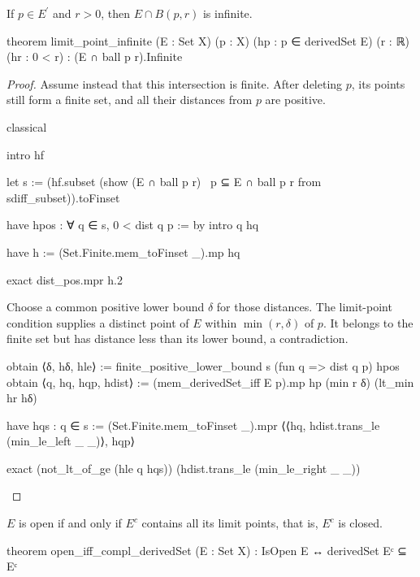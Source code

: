 \begin{proposition}
  \label{an1:thm:limit-point-neighborhood-contains-infinite-elements}
  If $p\in E^{\prime}$ and $r>0$, then $E\cap B(p,r)$ is infinite.

  \begin{lean}
    theorem limit_point_infinite (E : Set X) (p : X)
        (hp : p ∈ derivedSet E) (r : ℝ) (hr : 0 < r) :
        (E ∩ ball p r).Infinite
  \end{lean}
\end{proposition}

\begin{proof}
  Assume instead that this intersection is finite.
  After deleting $p$, its points still form a finite set, and all their distances from $p$ are
  positive.

  \begin{lean}
    classical

    intro hf

    let s := (hf.subset (show (E ∩ ball p r) \ {p} ⊆ E ∩ ball p r from sdiff_subset)).toFinset

    have hpos : ∀ q ∈ s, 0 < dist q p := by
      intro q hq

      have h := (Set.Finite.mem_toFinset _).mp hq

      exact dist_pos.mpr h.2
  \end{lean}

  Choose a common positive lower bound $\delta$ for those distances.
  The limit-point condition supplies a distinct point of $E$ within $\min(r,\delta)$ of $p$.
  It belongs to the finite set but has distance less than its lower bound, a contradiction.

  \begin{lean}
    obtain ⟨δ, hδ, hle⟩ := finite_positive_lower_bound s (fun q => dist q p) hpos
    obtain ⟨q, hq, hqp, hdist⟩ := (mem_derivedSet_iff E p).mp hp (min r δ) (lt_min hr hδ)

    have hqs : q ∈ s := (Set.Finite.mem_toFinset _).mpr
      ⟨⟨hq, hdist.trans_le (min_le_left _ _)⟩, hqp⟩

    exact (not_lt_of_ge (hle q hqs)) (hdist.trans_le (min_le_right _ _))
  \end{lean}

\end{proof}

\begin{proposition}
  \label{an1:thm:complement-of-open-set-is-closed}
  $E$ is open if and only if $E^{c}$ contains all its limit points, that is, $E^{c}$ is closed.

  \begin{lean}
    theorem open_iff_compl_derivedSet (E : Set X) :
        IsOpen E ↔ derivedSet Eᶜ ⊆ Eᶜ
  \end{lean}
\end{proposition}


